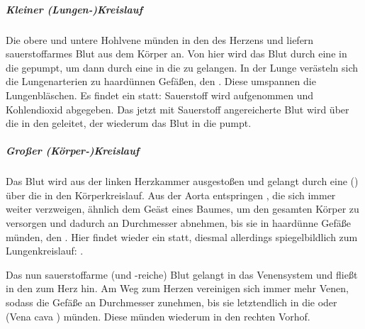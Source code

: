 {%
%
\subparagraph{Kleiner (Lungen-)Kreislauf}
Die obere und untere Hohlvene münden in den 
des Herzens und liefern sauerstoffarmes Blut aus
dem Körper an. Von hier wird das Blut 
durch eine 
in die 
gepumpt, um dann 
durch eine 
in die  zu
gelangen. In der Lunge verästeln sich die Lungenarterien
zu haardünnen Gefäßen, den . Diese
umspannen die Lungenbläschen. Es findet ein
 statt: Sauerstoff wird aufgenommen und
Kohlendioxid abgegeben. Das jetzt mit Sauerstoff
angereicherte Blut wird über die  in den
geleitet, der wiederum das Blut in die
pumpt.


\subparagraph{Großer (Körper-)Kreislauf}
Das Blut wird aus der linken Herzkammer ausgestoßen und
gelangt
durch eine  () 
über die 
in den Körperkreislauf. 
Aus der Aorta entspringen , die sich
immer weiter verzweigen, ähnlich dem Geäst eines Baumes, um den gesamten Körper zu versorgen und dadurch an Durchmesser abnehmen, bis sie in
haardünne Gefäße münden, den .
Hier findet wieder ein  statt, diesmal
allerdings spiegelbildlich zum Lungenkreislauf:
.

Das nun sauerstoffarme (und -reiche) Blut gelangt
in das Venensystem und fließt in
den  zum Herz hin. Am Weg zum Herzen vereinigen sich immer mehr Venen, sodass die Gefäße 
an Durchmesser zunehmen, 
bis sie letztendlich in die 
 oder 
(Vena cava ) 
münden. 
%
Diese münden wiederum in den rechten Vorhof.
}
